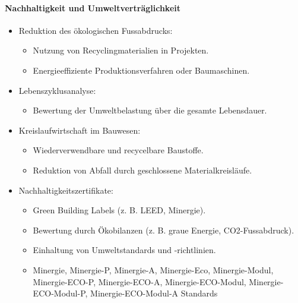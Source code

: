 \documentclass[
11pt,
captions=tableheading,
smallheadings,
headsepline,
footsepline, 
parskip=half-,
]{scrartcl}
\begin{document}
\paragraph{Nachhaltigkeit und Umweltverträglichkeit}
\begin{itemize}
    \item Reduktion des ökologischen Fussabdrucks:
          \begin{itemize}
              \item Nutzung von Recyclingmaterialien in Projekten.
              \item Energieeffiziente Produktionsverfahren oder Baumaschinen.
          \end{itemize}
    \item Lebenszyklusanalyse:
          \begin{itemize}
              \item Bewertung der Umweltbelastung über die gesamte Lebensdauer.
          \end{itemize}
    \item Kreislaufwirtschaft im Bauwesen:
          \begin{itemize}
              \item Wiederverwendbare und recycelbare Baustoffe.
              \item Reduktion von Abfall durch geschlossene Materialkreisläufe.
          \end{itemize}
    \item Nachhaltigkeitszertifikate:
          \begin{itemize}
              \item Green Building Labels (z. B. LEED, Minergie).
              \item Bewertung durch Ökobilanzen (z. B. graue Energie, CO2-Fussabdruck).
              \item Einhaltung von Umweltstandards und -richtlinien.
              \item Minergie, Minergie-P, Minergie-A, Minergie-Eco, Minergie-Modul, Minergie-ECO-P, Minergie-ECO-A, Minergie-ECO-Modul, Minergie-ECO-Modul-P, Minergie-ECO-Modul-A Standards
          \end{itemize}
\end{itemize}
\end{document}
